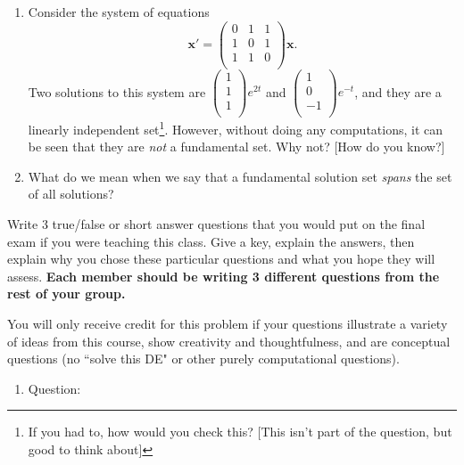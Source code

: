 \documentclass[12pt]{article}
\newcommand{\vecb}[1]{\mathbf{#1}}
\begin{document}
\begin{enumerate}
  \setcounter{problemnumber}{0}
\Problem \mbox{}
\begin{enumerate}
\item Consider the system of equations 
$$\vecb{x}'=\left( 
\begin{matrix}
0 & 1 & 1 \\
1 & 0 & 1 \\
1 & 1 & 0 \\
\end{matrix}
\right)\vecb{x}.$$ 
Two solutions to this system are 
$\left( 
\begin{smallmatrix} 
1  \\
1  \\
1  \\
\end{smallmatrix}
\right)e^{2t}$ 
and 
$\left( 
\begin{smallmatrix} 
1 \\
0 \\
-1 \\
\end{smallmatrix}
\right)e^{-t}$, and they are a linearly independent set\footnote{If you had to, how would you check this? [This isn't part of the question, but good to think about] }. However, without doing any computations, it can be seen that they are \emph{not} a fundamental set. Why not? [How do you know?]
\vfill

\item What do we mean when we say that a fundamental solution set \emph{spans} the set of all solutions?
\vfill

\end{enumerate}

\pagebreak
\Problem Write 3 true/false or short answer questions that you would put on the final exam if you were teaching this class. Give a key, explain the answers, then explain why you chose these particular questions and what you hope they will assess. \textbf{Each member should be writing 3 different questions from the rest of your group.} 

You will only receive credit for this problem if your questions illustrate a variety of ideas from this course, show creativity and thoughtfulness, and are conceptual questions (no ``solve this DE" or other purely computational questions). 

	\begin{enumerate}
	\item Question: \vspace*{12pt}
	

\end{enumerate}
\end{enumerate}
\end{document}
